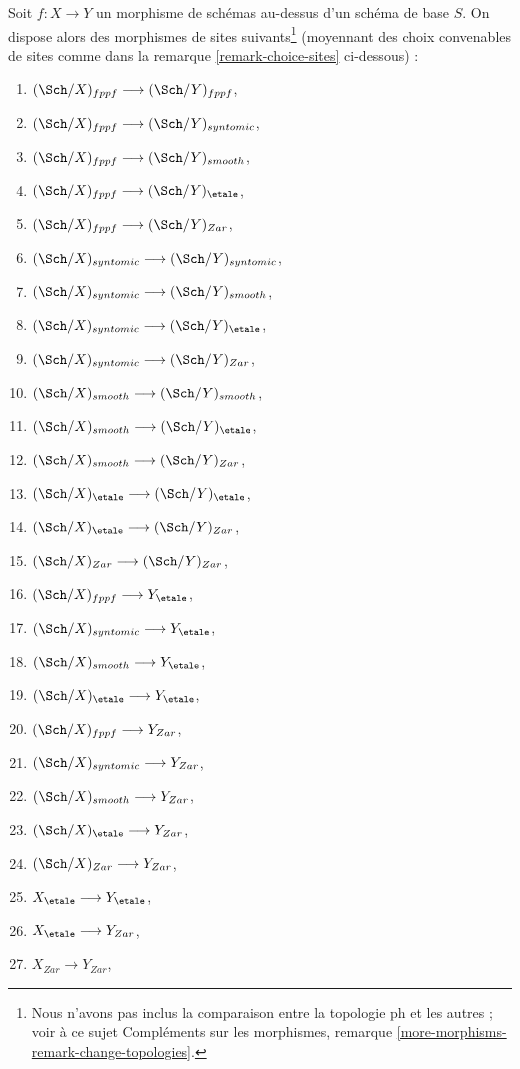 \noindent
Soit $f : X \to Y$ un morphisme de schémas au-dessus d'un schéma de base $S$.
On dispose alors des morphismes de sites suivants\footnote{Nous n'avons
pas inclus la comparaison entre la topologie ph et les autres ;
voir à ce sujet
Compléments sur les morphismes, remarque \ref{more-morphisms-remark-change-topologies}.}
(moyennant des choix convenables de sites comme dans la remarque
\ref{remark-choice-sites} ci-dessous) :
\begin{enumerate}
\item $(\Sch/X)_{fppf} \longrightarrow (\Sch/Y)_{fppf}$,
\item $(\Sch/X)_{fppf} \longrightarrow (\Sch/Y)_{syntomic}$,
\item $(\Sch/X)_{fppf} \longrightarrow (\Sch/Y)_{smooth}$,
\item $(\Sch/X)_{fppf} \longrightarrow
(\Sch/Y)_\etale$,
\item $(\Sch/X)_{fppf} \longrightarrow (\Sch/Y)_{Zar}$,
\item $(\Sch/X)_{syntomic} \longrightarrow (\Sch/Y)_{syntomic}$,
\item $(\Sch/X)_{syntomic} \longrightarrow (\Sch/Y)_{smooth}$,
\item $(\Sch/X)_{syntomic} \longrightarrow
(\Sch/Y)_\etale$,
\item $(\Sch/X)_{syntomic} \longrightarrow (\Sch/Y)_{Zar}$,
\item $(\Sch/X)_{smooth} \longrightarrow (\Sch/Y)_{smooth}$,
\item $(\Sch/X)_{smooth} \longrightarrow
(\Sch/Y)_\etale$,
\item $(\Sch/X)_{smooth} \longrightarrow (\Sch/Y)_{Zar}$,
\item $(\Sch/X)_\etale \longrightarrow
(\Sch/Y)_\etale$,
\item $(\Sch/X)_\etale \longrightarrow (\Sch/Y)_{Zar}$,
\item $(\Sch/X)_{Zar} \longrightarrow (\Sch/Y)_{Zar}$,
\item $(\Sch/X)_{fppf} \longrightarrow Y_\etale$,
\item $(\Sch/X)_{syntomic} \longrightarrow Y_\etale$,
\item $(\Sch/X)_{smooth} \longrightarrow Y_\etale$,
\item $(\Sch/X)_\etale \longrightarrow Y_\etale$,
\item $(\Sch/X)_{fppf} \longrightarrow Y_{Zar}$,
\item $(\Sch/X)_{syntomic} \longrightarrow Y_{Zar}$,
\item $(\Sch/X)_{smooth} \longrightarrow Y_{Zar}$,
\item $(\Sch/X)_\etale \longrightarrow Y_{Zar}$,
\item $(\Sch/X)_{Zar} \longrightarrow Y_{Zar}$,
\item $X_\etale \longrightarrow Y_\etale$,
\item $X_\etale \longrightarrow Y_{Zar}$,
\item $X_{Zar} \longrightarrow Y_{Zar}$,
\end{enumerate}
